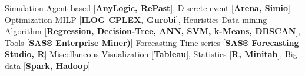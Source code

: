 


\begin{cvskills}
    \cvskill
    {Simulation}
    {Agent-based [\textbf{AnyLogic, RePast}], Discrete-event [\textbf{Arena, Simio}]}
    \cvskill
    {Optimization}
    {MILP [\textbf{ILOG CPLEX, Gurobi}], Heuristics}
    \cvskill
    {Data-mining}
    {Algorithm [\textbf{Regression, Decision-Tree, ANN, SVM, k-Means, DBSCAN}], Tools [\textbf{SAS® Enterprise Miner)}]}
	\cvskill
    {Forecasting}
    {Time series [\textbf{SAS® Forecasting Studio, R}]}
    \cvskill
    {Miscellaneous}
    {Visualization [\textbf{Tableau}], Statistics [\textbf{R, Minitab}], Big data [\textbf{Spark, Hadoop}]}    
  

\end{cvskills}



